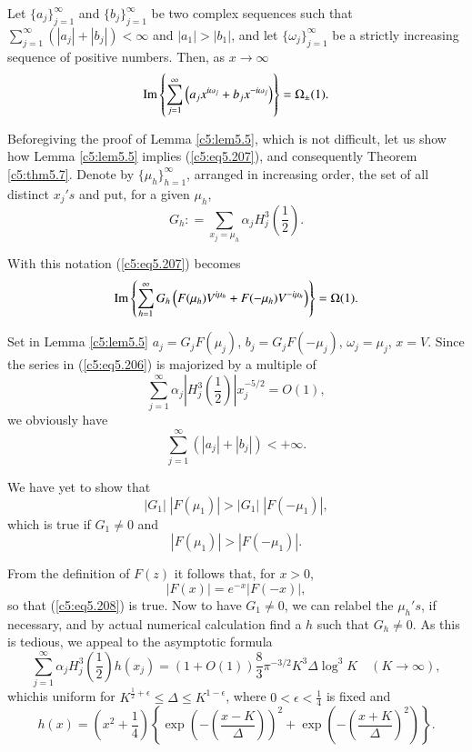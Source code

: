 \begin{lemma}\label{c5:lem5.5}
Let $\{a_j\}^\infty_{j=1}$ and $\{b_j\}^\infty_{j=1}$ be two complex
sequences such that $\sum\limits^\infty_{j=1} (|a_j| + |b_j|) <
\infty$ and $|a_1| >|b_1|$, and let 
$\{\omega_j\}^\infty_{j=1}$ be a strictly increasing sequence of
positive numbers. Then, as $x \to \infty$ 
$$
\operatorname{Im} \left\{\sum\limits^{\infty}_{j=1} \left(a_j x^{i\omega_j} + b_j
x^{-i\omega_j}\right) \right\} = \Omega_{\pm} (1). 
$$
\end{lemma}

Before\pageoriginale giving the proof of Lemma \ref{c5:lem5.5}, which
is not difficult, let us show how Lemma \ref{c5:lem5.5} implies
(\ref{c5:eq5.207}), and consequently Theorem \ref{c5:thm5.7}. Denote
by $\{\mu_h\}^\infty_{h=1}$, arranged in increasing order, the set of
all distinct $x_j's$ and put, for a given $\mu_h$, 
$$
G_h : = \sum\limits_{x_j = \mu_h} \alpha_j H^3_j \left(\frac{1}{2}
\right). 
$$

With this notation (\ref{c5:eq5.207}) becomes
$$ 
\operatorname{Im} \left\{ \sum\limits^\infty_{h=1} G_h \left(F (\mu_h) V^{i\mu_h} + 
F(-\mu_h) V^{-i\mu_h}\right) \right\} = \Omega(1). 
$$

Set in Lemma \ref{c5:lem5.5} $a_j = G_j F (\mu_j)$, $b_j = G_j F
(-\mu_j)$, $\omega_j = \mu_j$, $x = V$. Since the series in
(\ref{c5:eq5.206}) is majorized by a multiple of 
$$ 
\sum\limits^\infty_{j=1} \alpha_j  \left| H^3_j \left(\frac{1}{2}
\right)\right| x_j^{-5/2} = O (1), 
$$
we obviously have 
$$
\sum\limits^\infty_{j=1} \left(|a_j| + |b_j|\right) < + \infty. 
$$

We have yet to show that
$$
|G_1| \; |F(\mu_1)| > |G_1| \; |F(-\mu_1)|,
$$
which is true if $G_1 \neq 0$ and 
\begin{equation}
|F(\mu_1)| > |F(-\mu_1)|. \label{c5:eq5.208}
\end{equation}

From the definition of $F(z)$ it follows that, for $x  >0$,
$$
|F(x)| = e^{-x}|F(-x)|,
$$
so that (\ref{c5:eq5.208}) is true. Now to have $G_1 \neq 0$, we can
relabel the $\mu_h's$, if necessary, and by actual numerical
calculation find a $h$ such that $G_h \neq 0$. As this is tedious, we
appeal to the asymptotic formula 
{\fontsize{10pt}{12pt}\selectfont
\begin{equation}
\sum\limits^\infty_{j=1} \alpha_j H^3_j \left(\frac{1}{2} \right)
h(x_j) = (1+O(1)) \frac{8}{3} \pi^{-3/2} K^3 \Delta \log^3 K \quad (K
\to \infty),\label{c5:eq5.209} 
\end{equation}}
which\pageoriginale is uniform for $K^{\frac{1}{2} + \epsilon} \leq
\Delta \leq K^{1-\epsilon}$, where $0 < \epsilon < \frac{1}{4}$ is
fixed and 
$$
h(x) = \left(x^2 + \frac{1}{4} \right) \left\{ \exp \left(
-\left(\frac{x-K}{\Delta} \right)\right)^2 + \exp \left( -
\left(\frac{x+K}{\Delta} \right)^2 \right) \right\}.  
$$ 

